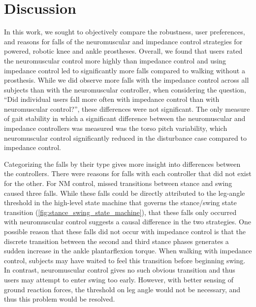 \section{Discussion}

In this work, we sought to objectively compare the robustness, user preferences,
and reasons for falls of the neuromuscular and impedance control strategies for
powered, robotic knee and ankle prostheses. Overall, we found that users rated
the neuromuscular control more highly than impedance control and using impedance
control led to significantly more falls compared to walking without a
prosthesis. While we did observe more falls with the impedance control across
all subjects than with the neuromuscular controller, when considering the
question, ``Did individual users fall more often with impedance control than
with neuromuscular control?'', these differences were not significant. The only
measure of gait stability in which a significant difference between the
neuromuscular and impedance controllers was measured was the torso pitch
variability, which neuromuscular control significantly reduced in the
disturbance case compared to impedance control.

Categorizing the falls by their type gives more insight into differences between
the controllers. There were reasons for falls with each controller that did not
exist for the other. For NM control, missed transitions between stance and swing
caused three falls. While these falls could be directly attributed to the
leg-angle threshold in the high-level state machine that governs the
stance/swing state transition (\cref{fig:stance_swing_state_machine}), that
these falls only occurred with neuromuscular control suggests a causal
difference in the two strategies. One possible reason that these falls did not
occur with impedance control is that the discrete transition between the second
and third stance phases generates a sudden increase in the ankle plantarflexion
torque. When walking with impedance control, subjects may have waited to feel
this transition before beginning swing. In contrast, neuromuscular control gives
no such obvious transition and thus users may attempt to enter swing too early.
However, with better sensing of ground reaction forces, the threshold on leg
angle would not be necessary, and thus this problem would be resolved.

